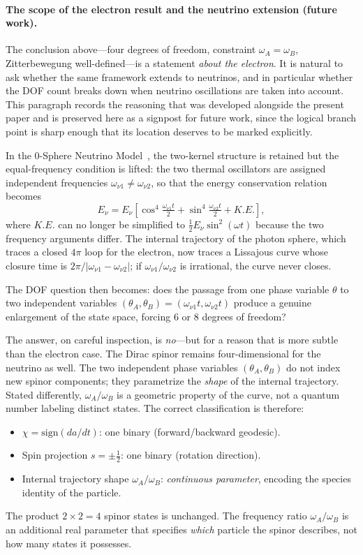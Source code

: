 \documentclass[%
 reprint, amsmath,amssymb, aps, prb, ]{revtex4-2}
\numberwithin{equation}{section}
\begin{document}
\paragraph{The scope of the electron result and the neutrino extension (future work).}
The conclusion above---four degrees of freedom, constraint $\omega_A = \omega_B$, Zitterbewegung well-defined---is a statement \emph{about the electron}. It is natural to ask whether the same framework extends to neutrinos, and in particular whether the DOF count breaks down when neutrino oscillations are taken into account. This paragraph records the reasoning that was developed alongside the present paper and is preserved here as a signpost for future work, since the logical branch point is sharp enough that its location deserves to be marked explicitly.

In the 0-Sphere Neutrino Model~\cite{hanamura09}, the two-kernel structure is retained but the equal-frequency condition is lifted: the two thermal oscillators are assigned independent frequencies $\omega_{\nu 1} \neq \omega_{\nu 2}$, so that the energy conservation relation becomes
\begin{equation}
E_\nu = E_\nu\!\left[\cos^4\!\tfrac{\omega_{\nu 1} t}{2} + \sin^4\!\tfrac{\omega_{\nu 2} t}{2} + K.E.\right],
\label{eq:neutrino_energy}
\end{equation}
where $K.E.$ can no longer be simplified to $\tfrac{1}{2}E_\nu\sin^2(\omega t)$ because the two frequency arguments differ. The internal trajectory of the photon sphere, which traces a closed $4\pi$ loop for the electron, now traces a Lissajous curve whose closure time is $2\pi/|\omega_{\nu1} - \omega_{\nu2}|$; if $\omega_{\nu1}/\omega_{\nu2}$ is irrational, the curve never closes.

The DOF question then becomes: does the passage from one phase variable $\theta$ to two independent variables $(\theta_A, \theta_B) = (\omega_{\nu1}t, \omega_{\nu2}t)$ produce a genuine enlargement of the state space, forcing 6 or 8 degrees of freedom?

The answer, on careful inspection, is \emph{no}---but for a reason that is more subtle than the electron case. The Dirac spinor remains four-dimensional for the neutrino as well. The two independent phase variables $(\theta_A, \theta_B)$ do not index new spinor components; they parametrize the \emph{shape} of the internal trajectory. Stated differently, $\omega_A/\omega_B$ is a geometric property of the curve, not a quantum number labeling distinct states. The correct classification is therefore:
\begin{itemize}
\item $\chi = \mathrm{sign}(da/dt)$: one binary (forward/backward geodesic).
\item Spin projection $s = \pm\tfrac{1}{2}$: one binary (rotation direction).
\item Internal trajectory shape $\omega_A/\omega_B$: \emph{continuous parameter}, encoding the species identity of the particle.
\end{itemize}
The product $2 \times 2 = 4$ spinor states is unchanged. The frequency ratio $\omega_A/\omega_B$ is an additional real parameter that specifies \emph{which} particle the spinor describes, not how many states it possesses.
\end{document}
